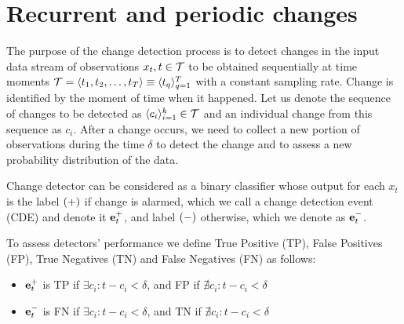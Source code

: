 \section{Recurrent and periodic changes}
\label{sec:chpprocess}
The purpose of the change detection process is to detect changes in the input data stream of observations $x_t, t \in \mathcal{T}$ to be obtained sequentially at time moments $\mathcal{T}=\langle t_1,t_2,\dots,t_T \rangle \equiv \langle t_q \rangle_{q=1}^T$ with a constant sampling rate.
Change is identified by the moment of time when it happened.
Let us denote the sequence of changes to be detected as $\langle c_i  \rangle_{i=1}^k \in \mathcal{T}$ and an individual change from this sequence as $c_i$.
After a change occurs, we need to collect a new portion of observations during the time $\delta$ to detect the change and to assess a new probability distribution of the data.

Change detector can be considered as a binary classifier whose output for each $x_t$ is the label $(+)$ if change is alarmed, which we call a change detection event (CDE) and denote it $\mathbf{e}_{t}^{+}$, and label $(-)$ otherwise, which we denote as  $\mathbf{e}_{t}^{-}$.

To assess detectors' performance we define True Positive (TP), False Positives (FP), True Negatives (TN) and False Negatives (FN) as follows:
\begin{itemize}[leftmargin=*]\setlength\itemsep{0em}
    \item $\mathbf{e}_{t}^{+}$ is TP if $\exists c_i:t-c_i<\delta$, and FP if $\nexists c_i:t-c_i<\delta$
    \item $\mathbf{e}_{t}^{-}$ is FN if $\exists c_i:t-c_i <\delta$, and TN if $\nexists c_i:t-c_i<\delta$
\end{itemize}

